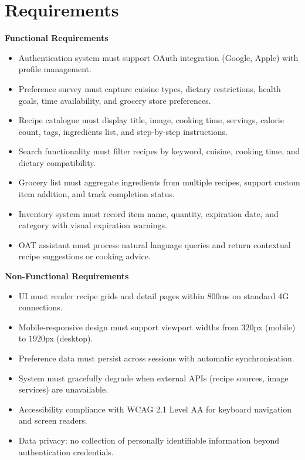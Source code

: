 \documentclass[12pt]{article}
\begin{document}
\section{Requirements}
\textbf{Functional Requirements}
\begin{itemize}
  \item Authentication system must support OAuth integration (Google, Apple) with profile management.
  \item Preference survey must capture cuisine types, dietary restrictions, health goals, time availability, and grocery store preferences.
  \item Recipe catalogue must display title, image, cooking time, servings, calorie count, tags, ingredients list, and step-by-step instructions.
  \item Search functionality must filter recipes by keyword, cuisine, cooking time, and dietary compatibility.
  \item Grocery list must aggregate ingredients from multiple recipes, support custom item addition, and track completion status.
  \item Inventory system must record item name, quantity, expiration date, and category with visual expiration warnings.
  \item OAT assistant must process natural language queries and return contextual recipe suggestions or cooking advice.
\end{itemize}
\textbf{Non-Functional Requirements}
\begin{itemize}
  \item UI must render recipe grids and detail pages within $800$ms on standard 4G connections.
  \item Mobile-responsive design must support viewport widths from $320$px (mobile) to $1920$px (desktop).
  \item Preference data must persist across sessions with automatic synchronisation.
  \item System must gracefully degrade when external APIs (recipe sources, image services) are unavailable.
  \item Accessibility compliance with WCAG 2.1 Level AA for keyboard navigation and screen readers.
  \item Data privacy: no collection of personally identifiable information beyond authentication credentials.
\end{itemize}
\end{document}
